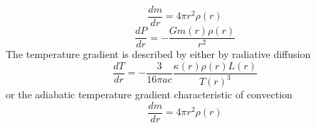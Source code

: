 \begin{equation}
    \frac{dm}{dr} = 4\pi r^2 \rho(r)
\end{equation}
\begin{equation}
    \frac{dP}{dr} = -\frac{G m(r)\rho(r)}{r^2}
\end{equation}
The temperature gradient is described by either by radiative diffusion
\begin{equation}
    \frac{dT}{dr} = -\frac{3}{16\pi ac}\frac{\kappa(r) \rho(r) L(r)}{T(r)^3 }
\end{equation}
or the adiabatic temperature gradient characteristic of convection
\begin{equation}
    \frac{dm}{dr} = 4\pi r^2 \rho(r)
\end{equation}